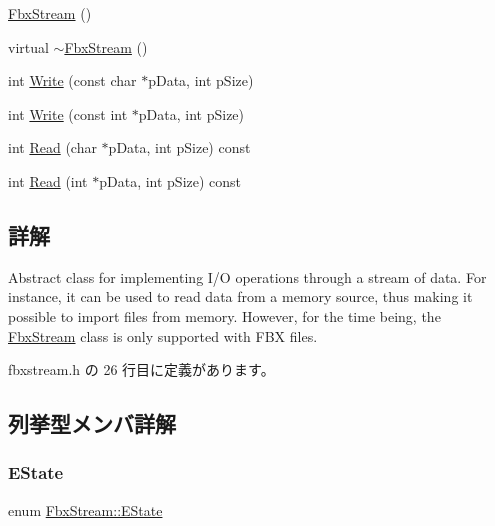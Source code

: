 \begin{DoxyCompactItemize}
\item 
\hyperlink{class_fbx_stream_ae1db7fc4d50c55cd8715ffd3ab2903b4}{Fbx\+Stream} ()
\item 
virtual \hyperlink{class_fbx_stream_a41562dba7c7948515f7c4997d6adbea5}{$\sim$\+Fbx\+Stream} ()
\item 
int \hyperlink{class_fbx_stream_a1506d750babeb4c981dc7aa4ce94d505}{Write} (const char $\ast$p\+Data, int p\+Size)
\item 
int \hyperlink{class_fbx_stream_aef3f0bcab29775b9deffb0142a399891}{Write} (const int $\ast$p\+Data, int p\+Size)
\item 
int \hyperlink{class_fbx_stream_ad54e82f43c2b8b441c427a77d2663a7e}{Read} (char $\ast$p\+Data, int p\+Size) const
\item 
int \hyperlink{class_fbx_stream_afeadb32985899a9d3eb21aead9bbb546}{Read} (int $\ast$p\+Data, int p\+Size) const
\end{DoxyCompactItemize}


\subsection{詳解}
Abstract class for implementing I/O operations through a stream of data. For instance, it can be used to read data from a memory source, thus making it possible to import files from memory. However, for the time being, the \hyperlink{class_fbx_stream}{Fbx\+Stream} class is only supported with F\+BX files. 

 fbxstream.\+h の 26 行目に定義があります。



\subsection{列挙型メンバ詳解}
\mbox{\label{class_fbx_stream_adc469d38eb30339fa4190eb6c66ec8f7}} 
\subsubsection{\texorpdfstring{E\+State}{EState}}
{\footnotesize\ttfamily enum \hyperlink{class_fbx_stream_adc469d38eb30339fa4190eb6c66ec8f7}{Fbx\+Stream\+::\+E\+State}}

